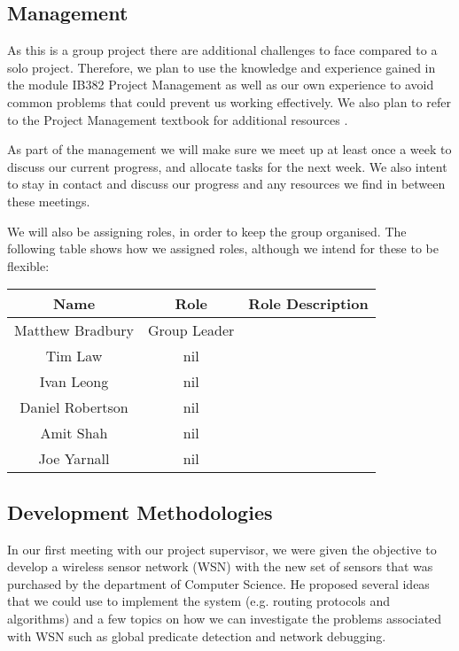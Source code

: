 \documentclass[a4paper]{article}
\begin{document}
\subsection{Management}

As this is a group project there are additional challenges to face compared to a solo project. Therefore, we plan to use the knowledge and experience gained in the module IB382 Project Management \cite{IB382} as well as our own experience to avoid common problems that could prevent us working effectively. We also plan to refer to the Project Management textbook for additional resources \cite{PMTextBook}.

As part of the management we will make sure we meet up at least once a week to discuss our current progress, and allocate tasks for the next week. We also intent to stay in contact and discuss our progress and any resources we find in between these meetings.

We will also be assigning roles, in order to keep the group organised. The following table shows how we assigned roles, although we intend for these to be flexible:

\begin{table}[H]
\centering
	\begin{tabular}{| c | c | c |}
		\hline
		Name & Role & Role Description\\
		\hline
		Matthew Bradbury & Group Leader & ~ \\
		Tim Law & nil & ~ \\
		Ivan Leong & nil & ~ \\
		Daniel Robertson & nil & ~ \\
		Amit Shah & nil & ~ \\
		Joe Yarnall & nil & ~ \\
		\hline
	\end{tabular}
\end{table}



\subsection{Development Methodologies}
In our first meeting with our project supervisor, we were given the objective to develop a wireless sensor network (WSN) with the new set of sensors that was purchased by the department of Computer Science. He proposed several ideas that we could use to implement the system (e.g. routing protocols and algorithms) and a few topics on how we can investigate the problems associated with WSN such as global predicate detection and network debugging. 
\end{document}
